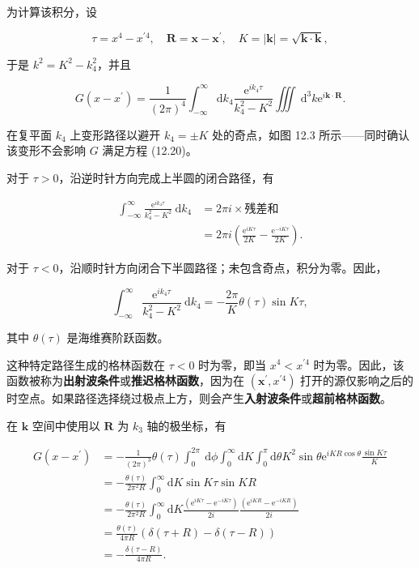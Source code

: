 为计算该积分，设

\[\tau = x^{4} - x^{\prime 4},\quad\mathbf{R} = \mathbf{x} - \mathbf{x}^{\prime},\quad K = \left| \mathbf{k} \right| = \sqrt{\mathbf{k} \cdot \mathbf{k}},\]

于是 \(k^{2} = K^{2} - k_{4}^{2}\)，并且

\[G\left( x - x^{\prime} \right) = \frac{1}{(2\pi)^{4}}\int_{- \infty}^{\infty}\mathrm{d}k_{4}\frac{\mathrm{e}^{ik_{4}\tau}}{k_{4}^{2} - K^{2}}\iiint\mathrm{\: d}^{3}k\mathrm{e}^{i\mathbf{k} \cdot \mathbf{R}}.\]

在复平面 \(k_{4}\) 上变形路径以避开 \(k_{4} = \pm K\) 处的奇点，如图
12.3 所示------同时确认该变形不会影响 \(G\) 满足方程 (12.20)。

对于 \(\tau > 0\)，沿逆时针方向完成上半圆的闭合路径，有

\[\begin{aligned}
\int_{- \infty}^{\infty}\frac{\mathrm{e}^{ik_{4}\tau}}{k_{4}^{2} - K^{2}}\mathrm{\: d}k_{4} & = 2\pi i \times \mathrm{\text{残差和}} \\
 & = 2\pi i\left( \frac{\mathrm{e}^{iK\tau}}{2K} - \frac{\mathrm{e}^{- iK\tau}}{2K} \right).
\end{aligned}\]

对于
\(\tau < 0\)，沿顺时针方向闭合下半圆路径；未包含奇点，积分为零。因此，

\[\int_{- \infty}^{\infty}\frac{\mathrm{e}^{ik_{4}\tau}}{k_{4}^{2} - K^{2}}\mathrm{\: d}k_{4} = - \frac{2\pi}{K}\theta(\tau)\sin K\tau,\]

其中 \(\theta(\tau)\) 是海维赛阶跃函数。

这种特定路径生成的格林函数在 \(\tau < 0\) 时为零，即当
\(x^{4} < x^{\prime 4}\)
时为零。因此，该函数被称为\textbf{出射波条件}或\textbf{推迟格林函数}，因为在
\(\left( \mathbf{x}^{\prime},x^{\prime 4} \right)\)
打开的源仅影响之后的时空点。如果路径选择绕过极点上方，则会产生\textbf{入射波条件}或\textbf{超前格林函数}。

在 \(\mathbf{k}\) 空间中使用以 \(\mathbf{R}\) 为 \(k_{3}\)
轴的极坐标，有

\[\begin{aligned}
G\left( x - x^{\prime} \right) & = - \frac{1}{(2\pi)^{3}}\theta(\tau)\int_{0}^{2\pi}\mathrm{\: d}\phi\int_{0}^{\infty}\mathrm{d}K\int_{0}^{\pi}\mathrm{d}\theta K^{2}\sin\theta\mathrm{e}^{iKR\cos\theta}\frac{\sin K\tau}{K} \\
 & = - \frac{\theta(\tau)}{2\pi^{2}R}\int_{0}^{\infty}\mathrm{d}K\sin K\tau\sin KR \\
 & = - \frac{\theta(\tau)}{2\pi^{2}R}\int_{0}^{\infty}\mathrm{d}K\frac{\left( \mathrm{e}^{iK\tau} - \mathrm{e}^{- iK\tau} \right)}{2i}\frac{\left( \mathrm{e}^{iKR} - \mathrm{e}^{- iKR} \right)}{2i} \\
 & = \frac{\theta(\tau)}{4\pi R}\left( \delta(\tau + R) - \delta(\tau - R) \right) \\
 & = - \frac{\delta(\tau - R)}{4\pi R}.
\end{aligned}\]

